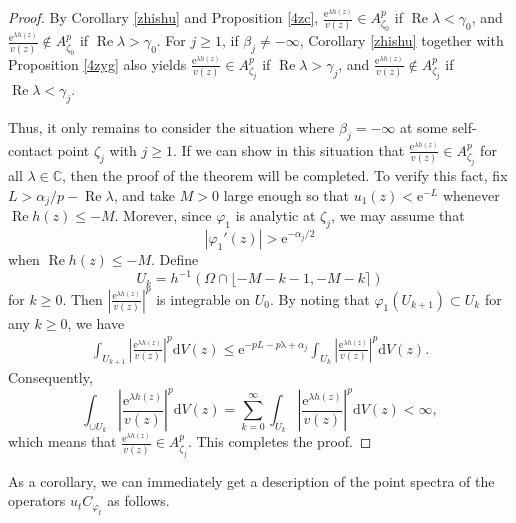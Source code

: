 \documentclass{amsart}
\theoremstyle{proclaim}
\theoremstyle{fancyproclaim}
\theoremstyle{definition}
\theoremstyle{fancystatement}
\numberwithin{equation}{section}
\begin{document}
\begin{proof}
By Corollary \ref{zhishu} and Proposition \ref{4zc}, $\frac{ \mathrm{e}^{\lambda h(z)}}{v(z)}\in A^p_{\zeta_0}$ if $ \operatorname{Re}\lambda<\gamma_0$, and $\frac{ \mathrm{e}^{\lambda h(z)}}{v(z)}\notin A^p_{\zeta_0}$ if $ \operatorname{Re}\lambda>\gamma_0$. For $j\geq 1$, if $\beta_j\ne-\infty$, Corollary \ref{zhishu} together with Proposition \ref{4zyg} also yields $\frac{ \mathrm{e}^{\lambda h(z)}}{v(z)}\in A^p_{\zeta_j}$ if $ \operatorname{Re}\lambda>\gamma_j$, and $\frac{ \mathrm{e}^{\lambda h(z)}}{v(z)}\notin A^p_{\zeta_j}$ if $ \operatorname{Re}\lambda<\gamma_j$. 

Thus, it only remains to consider the situation where $\beta_j=-\infty$ at some self-contact point $\zeta_j$ with $j\geq 1$. If we can show in this situation that $\frac{ \mathrm{e}^{\lambda h(z)}}{v(z)}\in A^p_{\zeta_j}$ for all $\lambda\in\mathbb{C}$, then the proof of the theorem will be completed. To verify this fact, fix $L>\alpha_j/p-\operatorname{Re}\lambda$, and take $M>0$ large enough so that $u_1(z)< \mathrm{e}^{-L}$ whenever $ \operatorname{Re}h(z)\leq-M$. Morever, since $\varphi_1$ is analytic at $\zeta_j$, we may assume that
$$|\varphi_1'(z)|> \mathrm{e}^{-\alpha_j/2}$$
when $ \operatorname{Re}h(z)\leq-M$. Define 
$$U_k=h^{-1}\left(\Omega\cap\lfloor-M-k-1,-M-k\rceil\right)$$
for $k\geq0$. Then $\left|\frac{ \mathrm{e}^{\lambda h(z)}}{v(z)}\right|^p$ is integrable on $U_0$. By noting that $\varphi_1(U_{k+1})\subset U_k$ for any $k\geq 0$, we have
\begin{align*}
\int_{U_{k+1}}\left|\frac{ \mathrm{e}^{\lambda h(z)}}{v(z)}\right|^p \mathrm{d}V(z)\leq \mathrm{e}^{-pL-p\mathrm{\lambda}+\alpha_j} \int_{U_k}\left|\frac{ \mathrm{e}^{\lambda h(z)}}{v(z)}\right|^p \mathrm{d}V(z).
\end{align*}
Consequently, 
$$\int_{\cup U_k}\left|\frac{ \mathrm{e}^{\lambda h(z)}}{v(z)}\right|^p \mathrm{d}V(z)=\sum_{k=0}^\infty\int_{U_k}\left|\frac{ \mathrm{e}^{\lambda h(z)}}{v(z)}\right|^p \mathrm{d}V(z)<\infty,$$
which means that $\frac{ \mathrm{e}^{\lambda h(z)}}{v(z)}\in A^p_{\zeta_j}$. This completes the proof.
\end{proof}

As a corollary, we can immediately get a description of the point spectra of the operators $u_tC_{\varphi_t}$ as follows.
\end{document}
